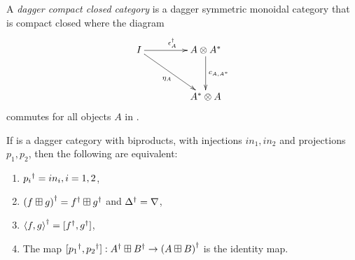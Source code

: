 \begin{definition}\label{def:daggercompact}
  A \emph{dagger compact closed category} \cD{} is a dagger symmetric monoidal category
  that is compact closed where the diagram
  \[
    \xymatrix @C+20pt @R+10pt{
      I \ar[r]^{\epsilon^{\dagger}_{A}} \ar[dr]_{\eta_{A}} &A\*A^{*}\ar[d]^{c_{A,A^{*}}}\\
      &A^{*}\* A
    }
  \]
  commutes for all  objects $A$ in \cD.
\end{definition}

\begin{lemma}\label{lemma:daggerbiproducts}
If \cD{} is a dagger category with biproducts, with injections $in_{1},in_{2}$ and projections
$p_{1},p_{2}$, then the following are equivalent:
\begin{enumerate}[{(}i{)}]
  \item ${p_{i}}^{\dagger} = in_{i}, i=1,2$, \label{ldpdgrpisq}
  \item ${(f\boxplus g)}^{\dagger} = {f}^{\dagger}\boxplus {g}^{\dagger}$ and ${\Delta}^{\dagger} = \nabla$,\label{ldpddeltisnab}
  \item ${\langle f,g\rangle}^{\dagger} = [{f}^{\dagger},{g}^{\dagger}]$,\label{ldpdcopisprod}
  \item The map $[{p_{1}}^{\dagger},{p_{2}}^{\dagger}]: {A}^{\dagger} \boxplus {B}^{\dagger} \to {(A\boxplus B)}^{\dagger}$ is
    the identity map.\label{ldpcommute}
\end{enumerate}
\end{lemma}
